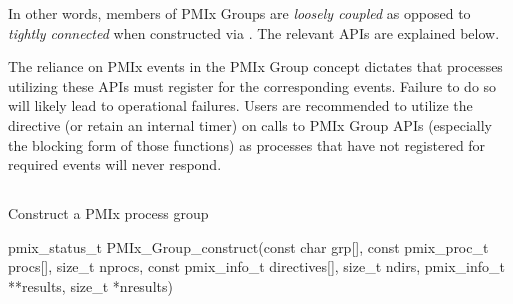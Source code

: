 In other words, members of \ac{PMIx} Groups are \emph{loosely coupled} as opposed to \emph{tightly connected} when constructed via . The relevant \acp{API} are explained below.

\adviceuserstart
The reliance on \ac{PMIx} events in the \ac{PMIx} Group concept dictates that processes utilizing these \acp{API} must register for the corresponding events. Failure to do so will likely lead to operational failures. Users are recommended to utilize the  directive (or retain an internal timer) on calls to \ac{PMIx} Group \acp{API} (especially the blocking form of those functions) as processes that have not registered for required events will never respond.
\adviceuserend

\subsection{}

\summary

Construct a \ac{PMIx} process group

\format

\cspecificstart
\begin{codepar}
pmix_status_t
PMIx_Group_construct(const char grp[],
                     const pmix_proc_t procs[], size_t nprocs,
                     const pmix_info_t directives[], size_t ndirs,
                     pmix_info_t **results, size_t *nresults)
\end{codepar}
\cspecificend

\begin{arglist}
\end{arglist}

